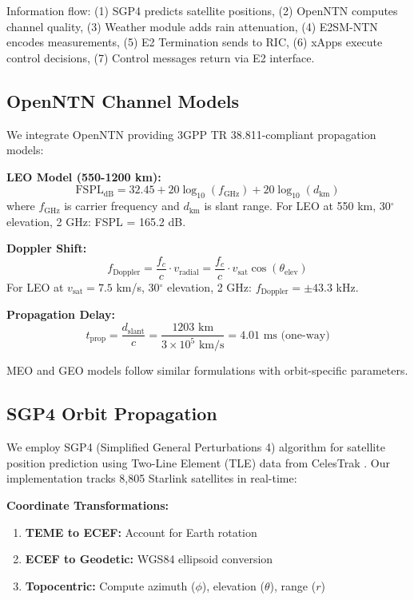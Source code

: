 \documentclass[conference]{IEEEtran}
\begin{document}
Information flow: (1) SGP4 predicts satellite positions, (2) OpenNTN computes channel quality, (3) Weather module adds rain attenuation, (4) E2SM-NTN encodes measurements, (5) E2 Termination sends to RIC, (6) xApps execute control decisions, (7) Control messages return via E2 interface.

\subsection{OpenNTN Channel Models}

We integrate OpenNTN \cite{openntn_2025} providing 3GPP TR 38.811-compliant propagation models:

\textbf{LEO Model (550-1200 km):}
\begin{equation}
\text{FSPL}_{\text{dB}} = 32.45 + 20\log_{10}(f_{\text{GHz}}) + 20\log_{10}(d_{\text{km}})
\end{equation}
where $f_{\text{GHz}}$ is carrier frequency and $d_{\text{km}}$ is slant range. For LEO at 550 km, 30$^\circ$ elevation, 2 GHz: FSPL = 165.2 dB.

\textbf{Doppler Shift:}
\begin{equation}
f_{\text{Doppler}} = \frac{f_c}{c} \cdot v_{\text{radial}} = \frac{f_c}{c} \cdot v_{\text{sat}} \cos(\theta_{\text{elev}})
\end{equation}
For LEO at $v_{\text{sat}} = 7.5$ km/s, 30$^\circ$ elevation, 2 GHz: $f_{\text{Doppler}} = \pm 43.3$ kHz.

\textbf{Propagation Delay:}
\begin{equation}
t_{\text{prop}} = \frac{d_{\text{slant}}}{c} = \frac{1203 \text{ km}}{3 \times 10^5 \text{ km/s}} = 4.01 \text{ ms (one-way)}
\end{equation}

MEO and GEO models follow similar formulations with orbit-specific parameters.

\subsection{SGP4 Orbit Propagation}

We employ SGP4 (Simplified General Perturbations 4) algorithm \cite{sgp4_theory} for satellite position prediction using Two-Line Element (TLE) data from CelesTrak \cite{celestrak}. Our implementation tracks 8,805 Starlink satellites in real-time:

\textbf{Coordinate Transformations:}
\begin{enumerate}
    \item \textbf{TEME to ECEF:} Account for Earth rotation
    \item \textbf{ECEF to Geodetic:} WGS84 ellipsoid conversion
    \item \textbf{Topocentric:} Compute azimuth ($\phi$), elevation ($\theta$), range ($r$)
\end{enumerate}
\end{document}
